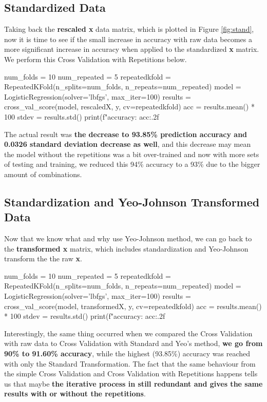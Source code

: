 \documentclass[11pt]{article}
\begin{document}
\subsection{Standardized Data}

Taking back the \textbf{rescaled x} data matrix, which is plotted in Figure \ref{fig:stand}, now it is time to see if the small increase in accuracy with raw data becomes a more significant increase in accuracy when applied to the standardized \textbf{x} matrix. We perform this Cross Validation with Repetitions below.
\\

\begin{python}
num_folds = 10
num_repeated = 5
repeatedkfold = RepeatedKFold(n_splits=num_folds, n_repeats=num_repeated)
model = LogisticRegression(solver='lbfgs', max_iter=100)
results = cross_val_score(model, rescaledX, y, cv=repeatedkfold)
acc = results.mean() * 100
stdev = results.std()
print(f"accuracy: {acc:.2f}%
\end{python}

The actual result was \textbf{the decrease to 93.85\% prediction accuracy and 0.0326 standard deviation decrease as well}, and this decrease may mean the model without the repetitions was a bit over-trained and now with more sets of testing and training, we reduced this 94\% accuracy to a 93\% due to the bigger amount of combinations.

\subsection{Standardization and Yeo-Johnson Transformed Data}

Now that we know what and why use Yeo-Johnson method, we can go back to the \textbf{transformed x} matrix, which includes standardization and Yeo-Johnson transform the the raw \textbf{x}.
\\

\begin{python}
num_folds = 10
num_repeated = 5
repeatedkfold = RepeatedKFold(n_splits=num_folds, n_repeats=num_repeated)
model = LogisticRegression(solver='lbfgs', max_iter=100)
results = cross_val_score(model, transformedX, y, cv=repeatedkfold)
acc = results.mean() * 100
stdev = results.std()
print(f"accuracy: {acc:.2f}%
\end{python}

Interestingly, the same thing occurred when we compared the Cross Validation with raw data to Cross Validation with Standard and Yeo's method, \textbf{we go from 90\% to 91.60\% accuracy}, while the highest (93.85\%) accuracy was reached with only the Standard Transformation. The fact that the same behaviour from the simple Cross Validation and Cross Validation with Repetitions happens tells us that maybe \textbf{the iterative process in still redundant and gives the same results with or without the repetitions}.
\end{document}
